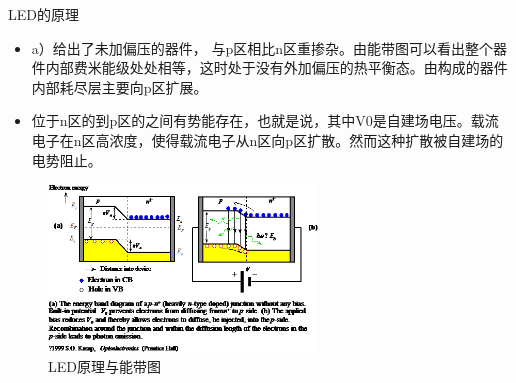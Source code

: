 \documentclass[trans]{beamer} %
\begin{document}
 \begin{frame}{LED的原理}

    \begin{itemize}
        \item  a）给出了未加偏压的器件， 与p区相比n区重掺杂。由能带图可以看出整个器件内部费米能级处处相等，这时处于没有外加偏压的热平衡态。由构成的器件内部耗尽层主要向p区扩展。
        \item  位于n区的到p区的之间有势能存在，也就是说，其中V0是自建场电压。载流电子在n区高浓度，使得载流电子从n区向p区扩散。然而这种扩散被自建场的电势阻止。
    \end{itemize}
    \begin{figure}[htbp] 
    \centering\includegraphics[height=1.75in]{source/ch2/fg224.png} 
    \caption{LED原理与能带图} \label{fig:led}
    \end{figure}  
 \end{frame}
\end{document}
